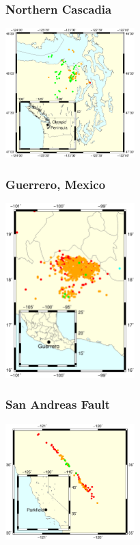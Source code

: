 \documentclass{beamer}
\begin{document}
	\begin{frame}
		\frametitle{Northern Cascadia}
		\begin{center}
			\includegraphics[width=5cm, trim={1cm 2cm 2cm 2cm}, clip]{other/cascadia.eps}
		\end{center}
	\end{frame}

	\begin{frame}
		\frametitle{Guerrero, Mexico}
		\begin{center}
			\includegraphics[width=5cm, trim={1cm 2cm 6cm 8cm}, clip]{other/guerrero.eps}
		\end{center}
	\end{frame}

	\begin{frame}
		\frametitle{San Andreas Fault}
		\begin{center}
			\includegraphics[width=5cm, trim={1cm 2cm 1cm 4cm}, clip]{other/sanandreas.eps}
		\end{center}
	\end{frame}
\end{document}
